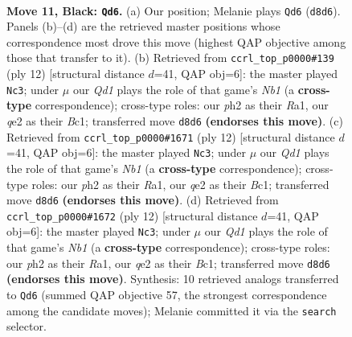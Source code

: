 \documentclass[11pt]{article}
\begin{document}
\begin{figure}[p]\centering
\begin{subfigure}{0.46\textwidth}\centering
\resizebox{\linewidth}{!}{%
\newchessgame
\chessboard[
  setfen={rnbq1rk1/p3b1pp/1pp2n2/3p1p2/3P4/1P2PNP1/P3QPBP/RNB1R1K1 b - - 1 11},
  showmover=false,
  pgfstyle=straightmove, color=movearrow, markmove={d8-d6}
]}
\caption{}
\end{subfigure}\hfill
\begin{subfigure}{0.46\textwidth}\centering
\resizebox{\linewidth}{!}{%
\newchessgame
\chessboard[
  setfen={rnbq1rk1/pp2ppbp/2pp1np1/8/2PP4/5NP1/PP2PPBP/RNBQ1RK1 w - - 0 7},
  showmover=false,
  pgfstyle=straightmove, color=movearrow, markmove={b1-c3}
]}
\caption{}
\end{subfigure}
\\[4pt]
\begin{subfigure}{0.46\textwidth}\centering
\resizebox{\linewidth}{!}{%
\newchessgame
\chessboard[
  setfen={rnbq1rk1/pp2ppbp/2pp1np1/8/2PP4/5NP1/PP2PPBP/RNBQ1RK1 w - - 0 7},
  showmover=false,
  pgfstyle=straightmove, color=movearrow, markmove={b1-c3}
]}
\caption{}
\end{subfigure}\hfill
\begin{subfigure}{0.46\textwidth}\centering
\resizebox{\linewidth}{!}{%
\newchessgame
\chessboard[
  setfen={rnbq1rk1/pp2ppbp/2pp1np1/8/2PP4/5NP1/PP2PPBP/RNBQ1RK1 w - - 0 7},
  showmover=false,
  pgfstyle=straightmove, color=movearrow, markmove={b1-c3}
]}
\caption{}
\end{subfigure}
\caption{\textbf{Move 11, Black: \texttt{Qd6}.} (a) Our position; Melanie plays \texttt{Qd6} (\texttt{d8d6}). Panels (b)--(d) are the retrieved master positions whose correspondence most drove this move (highest QAP objective among those that transfer to it). (b) Retrieved from \texttt{ccrl\_top\_p0000\#139} (ply 12) [structural distance $d$=41, QAP obj=6]: the master played \texttt{Nc3}; under $\mu$ our \emph{Qd1} plays the role of that game's \emph{Nb1} (a \textbf{cross-type} correspondence); cross-type roles: our \emph{p}h2 as their \emph{R}a1, our \emph{q}e2 as their \emph{B}c1; transferred move \texttt{d8d6} \textbf{(endorses this move)}. (c) Retrieved from \texttt{ccrl\_top\_p0000\#1671} (ply 12) [structural distance $d$=41, QAP obj=6]: the master played \texttt{Nc3}; under $\mu$ our \emph{Qd1} plays the role of that game's \emph{Nb1} (a \textbf{cross-type} correspondence); cross-type roles: our \emph{p}h2 as their \emph{R}a1, our \emph{q}e2 as their \emph{B}c1; transferred move \texttt{d8d6} \textbf{(endorses this move)}. (d) Retrieved from \texttt{ccrl\_top\_p0000\#1672} (ply 12) [structural distance $d$=41, QAP obj=6]: the master played \texttt{Nc3}; under $\mu$ our \emph{Qd1} plays the role of that game's \emph{Nb1} (a \textbf{cross-type} correspondence); cross-type roles: our \emph{p}h2 as their \emph{R}a1, our \emph{q}e2 as their \emph{B}c1; transferred move \texttt{d8d6} \textbf{(endorses this move)}. Synthesis: 10 retrieved analogs transferred to \texttt{Qd6} (summed QAP objective 57, the strongest correspondence among the candidate moves); Melanie committed it via the \texttt{search} selector.}
\label{fig:thought-m21}
\end{figure}
\end{document}
